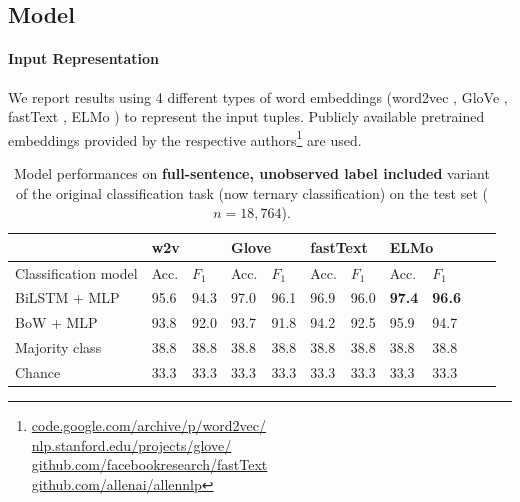 \documentclass[letterpaper]{article} %
\begin{document}
\subsection{Model}
\label{ex1:model}
\paragraph{Input Representation} We report results using 4 different types of word embeddings (word2vec \cite{mikolov2013efficient}, GloVe \cite{pennington2014glove}, fastText \cite{bojanowski2016enriching}, ELMo \cite{peters2018deep}) to represent the input tuples. Publicly available pretrained embeddings provided by the respective authors\footnote{\url{code.google.com/archive/p/word2vec/}\\ \url{nlp.stanford.edu/projects/glove/}\\
\url{github.com/facebookresearch/fastText} \\
\url{github.com/allenai/allennlp}} are used.

\begin{table}[h]
	\centering
	\begin{tabular}{@{}lllllllllll@{}}
		\toprule
		& \multicolumn{2}{l}{w2v}  & \multicolumn{2}{l}{Glove} &  \multicolumn{2}{l}{fastText} & \multicolumn{2}{l}{ELMo}  \\ \midrule
		Classification model       & Acc. & $F_1$ & Acc. & $F_1$ & Acc. & $F_1$ & Acc. & $F_1$   \\ \midrule
		BiLSTM + MLP &  95.6  & 94.3 \hspace{1cm} & 97.0  & 96.1  \hspace{1cm} & 96.9 & 96.0  \hspace{1cm} & \textbf{97.4} & \textbf{96.6} \\
		BoW + MLP & 93.8 & 92.0& 93.7& 91.8& 94.2 & 92.5& 95.9 & 94.7 \\
		Majority class & 38.8 & 38.8 & 38.8 & 38.8 & 38.8 & 38.8 & 38.8 & 38.8 \\
		Chance       & 33.3  & 33.3  & 33.3 & 33.3 & 33.3 & 33.3 & 33.3  & 33.3  \\
		\bottomrule
	\end{tabular}
	\caption{Model performances on \textbf{full-sentence, unobserved label included} variant of the original classification task (now ternary classification) on the test set ($n=18,764$).}
	\label{ex1-2:full sentence task}
\end{table}
\end{document}
